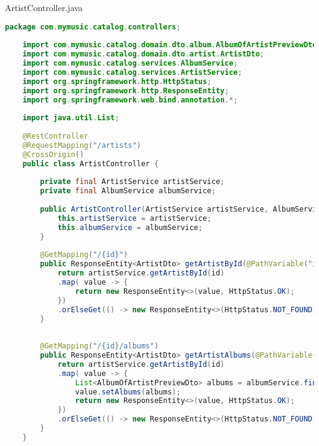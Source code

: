 
ArtistController.java
\begin{lstlisting}[language=java]
	package com.mymusic.catalog.controllers;
	
	import com.mymusic.catalog.domain.dto.album.AlbumOfArtistPreviewDto;
	import com.mymusic.catalog.domain.dto.artist.ArtistDto;
	import com.mymusic.catalog.services.AlbumService;
	import com.mymusic.catalog.services.ArtistService;
	import org.springframework.http.HttpStatus;
	import org.springframework.http.ResponseEntity;
	import org.springframework.web.bind.annotation.*;
	
	import java.util.List;
	
	@RestController
	@RequestMapping("/artists")
	@CrossOrigin()
	public class ArtistController {
		
		private final ArtistService artistService;
		private final AlbumService albumService;
		
		public ArtistController(ArtistService artistService, AlbumService albumService) {
			this.artistService = artistService;
			this.albumService = albumService;
		}
		
		@GetMapping("/{id}")
		public ResponseEntity<ArtistDto> getArtistById(@PathVariable("id") Long id) {
			return artistService.getArtistById(id)
			.map( value -> {
				return new ResponseEntity<>(value, HttpStatus.OK);
			})
			.orElseGet(() -> new ResponseEntity<>(HttpStatus.NOT_FOUND));
		}
		
		
		@GetMapping("/{id}/albums")
		public ResponseEntity<ArtistDto> getArtistAlbums(@PathVariable("id") Long id) {
			return artistService.getArtistById(id)
			.map( value -> {
				List<AlbumOfArtistPreviewDto> albums = albumService.findArtistAlbums(id);
				value.setAlbums(albums);
				return new ResponseEntity<>(value, HttpStatus.OK);
			})
			.orElseGet(() -> new ResponseEntity<>(HttpStatus.NOT_FOUND));
		}
	}
	
\end{lstlisting}

